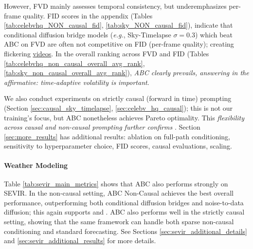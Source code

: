 \documentclass{article}
\begin{document}
However, FVD mainly assesses temporal consistency, but underemphasizes per-frame quality. FID scores in the appendix (Tables \ref{tab:celebvhq_NON_causal_fid}, \ref{tab:sky_NON_causal_fid}), indicate that conditional diffusion bridge models (\textit{e.g.}, Sky-Timelapse $\sigma=0.3$) which beat ABC on FVD are often not competitive on FID (per-frame quality); creating flickering \href{https://abc-diffusion.github.io/}{videos}. In the overall ranking across FVD and FID (Tables \ref{tab:celebvhq_non_causal_overall_avg_rank}, \ref{tab:sky_non_causal_overall_avg_rank}), \textit{ABC clearly prevails, answering  in the affirmative: time-adaptive volatility is important}.

We also conduct experiments on strictly causal (forward in time) prompting (Section \ref{sec:causal_sky_timelapse}, \ref{sec:celebv_hq_causal}); this is not our training's focus, but ABC nonetheless achieves Pareto optimality. This \textit{flexibility across causal and non-causal prompting further confirms }.
Section \ref{sec:more_results} has additional results: ablation on full-path conditioning, sensitivity to hyperparameter choice, FID scores, causal evaluations, scaling.




\paragraph{Weather Modeling}
Table \ref{tab:sevir_main_metrics} %
shows that ABC also performs strongly on SEVIR. In the non-causal setting, ABC Non-Causal achieves the best overall performance, outperforming both conditional diffusion bridges and noise-to-data diffusion; this again supports  and . ABC also performs well in the strictly causal setting, showing that the same framework can handle both sparse non-causal conditioning and standard forecasting. See Sections \ref{sec:sevir_additional_details} and \ref{sec:sevir_additional_results} for more details.
\end{document}
